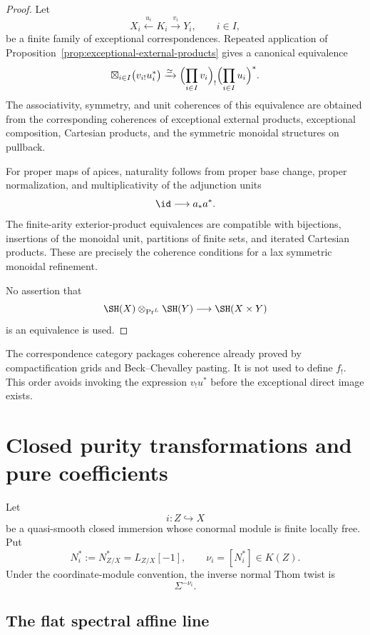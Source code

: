 \begin{proof}
Let
\[
    X_i\xleftarrow{u_i}K_i\xrightarrow{v_i}Y_i,
    \qquad
    i\in I,
\]
be a finite family of exceptional correspondences.  Repeated application
of Proposition~\ref{prop:exceptional-external-products} gives a canonical
equivalence
\[
    \boxtimes_{i\in I}
    \bigl(
      v_{i!}u_i^*
    \bigr)
    \xrightarrow{\simeq}
    \Bigl(
      \prod_{i\in I}v_i
    \Bigr)_!
    \Bigl(
      \prod_{i\in I}u_i
    \Bigr)^*.
\]
The associativity, symmetry, and unit coherences of this equivalence are
obtained from the corresponding coherences of exceptional external
products, exceptional composition, Cartesian products, and the symmetric
monoidal structures on pullback.

For proper maps of apices, naturality follows from proper base change,
proper normalization, and multiplicativity of the adjunction units
\[
    \id\longrightarrow a_*a^*.
\]
The finite-arity exterior-product equivalences are compatible with
bijections, insertions of the monoidal unit, partitions of finite sets, and
iterated Cartesian products.  These are precisely the coherence conditions
for a lax symmetric monoidal refinement.

No assertion that
\[
    \SH(X)\otimes_{\operatorname{Pr}^L}\SH(Y)
    \longrightarrow
    \SH(X\times Y)
\]
is an equivalence is used.
\end{proof}

\begin{remark}
\label{rem:correspondences-role}
The correspondence category packages coherence already proved by
compactification grids and Beck--Chevalley pasting.  It is not used to
define \(f_!\).  This order avoids invoking the expression \(v_!u^*\) before
the exceptional direct image exists.
\end{remark}

\section{Closed purity transformations and pure coefficients}
\label{sec:six-closed-purity}

Let
\[
    i:Z\hookrightarrow X
\]
be a quasi-smooth closed immersion whose conormal module is finite locally
free.  Put
\[
    N_i^*:=N^*_{Z/X}=L_{Z/X}[-1],
    \qquad
    \nu_i=[N_i^*]\in K(Z).
\]
Under the coordinate-module convention, the inverse normal Thom twist is
\[
    \Sigma^{-\nu_i}.
\]

\subsection{The flat spectral affine line}

